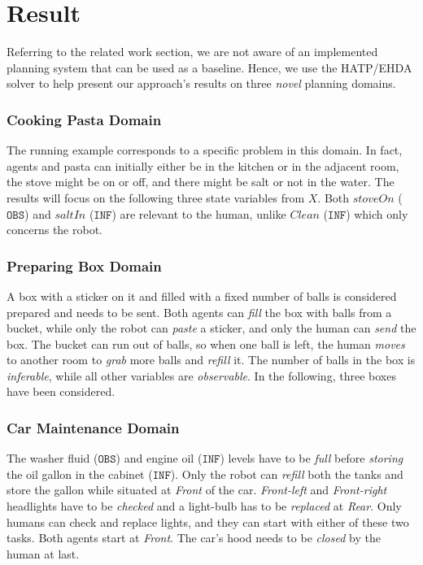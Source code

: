 {%
\section{Result}

Referring to the related work section, we are not aware of an implemented planning system that can be used as a baseline. Hence, we use the HATP/EHDA solver to help present our approach's results on three \textit{novel} planning domains.

\subsubsection{Cooking Pasta Domain}
The running example corresponds to a specific problem in this domain. In fact, agents and pasta can initially either be in the kitchen or in the adjacent room, the stove might be on or off, and there might be salt or not in the water.  
The results will focus on the following three state variables from $X$. Both $stoveOn$ ($\texttt{OBS}$) and $saltIn$ ($\texttt{INF}$) are relevant to the human, unlike $Clean$ ($\texttt{INF}$) which only concerns the robot. 

\subsubsection{Preparing Box Domain}
A box with a sticker on it and filled with a fixed number of balls is considered prepared and needs to be sent. Both agents can \textit{fill} the box with balls from a bucket, while only the robot can \textit{paste} a sticker, and only the human can \textit{send} the box. The bucket can run out of balls, so when one ball is left, the human \textit{moves} to another room to \textit{grab} more balls and \textit{refill} it. 
The number of balls in the box is \textit{inferable}, while all other variables are {\em observable}. 
In the following, three boxes have been considered.

\subsubsection{Car Maintenance Domain}
The washer fluid ($\texttt{OBS}$) and engine oil ($\texttt{INF}$) levels have to be \textit{full} before \textit{storing} the oil gallon in the cabinet ($\texttt{INF}$). 
Only the robot can \textit{refill} both the tanks and store the gallon while situated at \textit{Front} of the car. 
\textit{Front-left} and \textit{Front-right} headlights have to be \textit{checked} and a light-bulb has to be \textit{replaced} at \textit{Rear}. 
Only humans can check and replace lights, and they can start with either of these two tasks.
Both agents start at \textit{Front}.
The car's hood needs to be \textit{closed} by the human at last.

}
